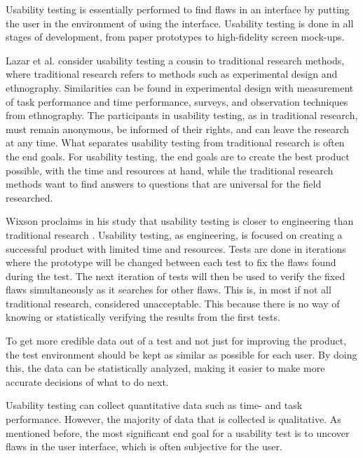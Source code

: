 Usability testing is essentially performed to find flaws in an interface by putting the user in the environment of using the interface. Usability testing is done in all stages of development, from paper prototypes to high-fidelity screen mock-ups. 

Lazar et al.\cite[Chapter~10]{lazar2017research}  consider usability testing a cousin to traditional research methods, where traditional research refers to methods such as experimental design\cite[Chapter~3]{lazar2017research}  and ethnography\cite[Chapter~9]{lazar2017research}.
Similarities can be found in experimental design with measurement of task performance and time performance, surveys, and observation techniques from ethnography. The participants in usability testing, as in traditional research, must remain anonymous, be informed of their rights, and can leave the research at any time. What separates usability testing from traditional research is often the end goals. For usability testing, the end goals are to create the best product possible, with the time and resources at hand, while the traditional research methods want to find answers to questions that are universal for the field researched. 
	
Wixson proclaims in his study that usability testing is closer to engineering than traditional research \cite{wixon2003evaluating}. Usability testing, as engineering, is focused on creating a successful product with limited time and resources. Tests are done in iterations where the prototype will be changed between each test to fix the flaws found during the test. The next iteration of tests will then be used to verify the fixed flaws simultaneously as it searches for other flaws. This is, in most if not all traditional research, considered unacceptable. This because there is no way of knowing or statistically verifying the results from the first tests. 

To get more credible data out of a test and not just for improving the product, the test environment should be kept as similar as possible for each user. By doing this, the data can be statistically analyzed, making it easier to make more accurate decisions of what to do next.

Usability testing can collect quantitative data such as time- and task performance. However, the majority of data that is collected is qualitative. As mentioned before, the most significant end goal for a usability test is to uncover flaws in the user interface, which is often subjective for the user. 

